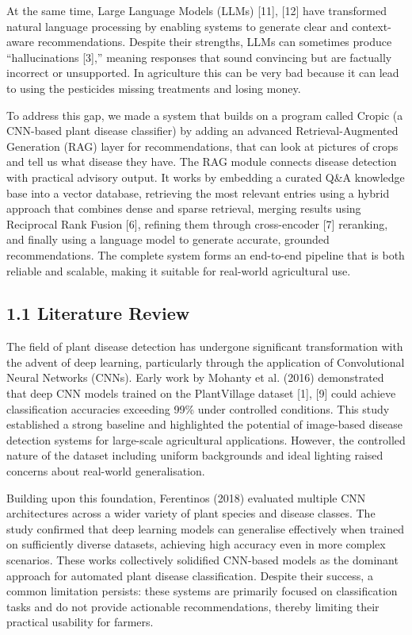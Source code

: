 At the same time, Large Language Models (LLMs) {[}11{]}, {[}12{]} have
transformed natural language processing by enabling systems to generate
clear and context-aware recommendations. Despite their strengths, LLMs
can sometimes produce ``hallucinations {[}3{]},'' meaning responses that
sound convincing but are factually incorrect or unsupported. In
agriculture this can be very bad because it can lead to using the
pesticides missing treatments and losing money.

To address this gap, we made a system that builds on a program called
Cropic (a CNN-based plant disease classifier) by adding an advanced
Retrieval-Augmented Generation (RAG) layer for recommendations, that can
look at pictures of crops and tell us what disease they have. The RAG
module connects disease detection with practical advisory output. It
works by embedding a curated Q\&A knowledge base into a vector database,
retrieving the most relevant entries using a hybrid approach that
combines dense and sparse retrieval, merging results using Reciprocal
Rank Fusion {[}6{]}, refining them through cross-encoder {[}7{]}
reranking, and finally using a language model to generate accurate,
grounded recommendations. The complete system forms an end-to-end
pipeline that is both reliable and scalable, making it suitable for
real-world agricultural use.

\subsection*{1.1 Literature Review}\label{literature-review}

The field of plant disease detection has undergone significant
transformation with the advent of deep learning, particularly through
the application of Convolutional Neural Networks (CNNs). Early work by
Mohanty et al. (2016) demonstrated that deep CNN models trained on the
PlantVillage dataset {[}1{]}, {[}9{]} could achieve classification
accuracies exceeding 99\% under controlled conditions. This study
established a strong baseline and highlighted the potential of
image-based disease detection systems for large-scale agricultural
applications. However, the controlled nature of the dataset including
uniform backgrounds and ideal lighting raised concerns about real-world
generalisation.

Building upon this foundation, Ferentinos (2018) evaluated multiple CNN
architectures across a wider variety of plant species and disease
classes. The study confirmed that deep learning models can generalise
effectively when trained on sufficiently diverse datasets, achieving
high accuracy even in more complex scenarios. These works collectively
solidified CNN-based models as the dominant approach for automated plant
disease classification. Despite their success, a common limitation
persists: these systems are primarily focused on classification tasks
and do not provide actionable recommendations, thereby limiting their
practical usability for farmers.

